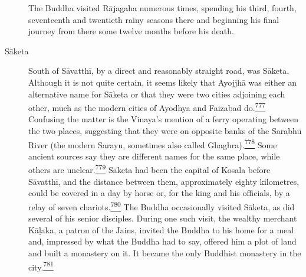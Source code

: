 \begin{description}
The Buddha visited Rājagaha numerous times, spending his third, fourth,
seventeenth and twentieth rainy seasons there and beginning his final
journey from there some twelve months before his death.
\item[Sāketa]
South of Sāvatthī, by a direct and reasonably straight road, was Sāketa.
Although it is not quite certain, it seems likely that Ayojjhā was
either an alternative name for Sāketa or that they were two cities
adjoining each other, much as the modern cities of Ayodhya and Faizabad
do.\label{footprints_split_019.html_fnref777}\hyperref[footprints_split_025.htmlux5cux23fn777]{\textsuperscript{777}}
Confusing the matter is the Vinaya's mention of a ferry operating
between the two places, suggesting that they were on opposite banks of
the Sarabhū River (the modern Sarayu, sometimes also called
Ghaghra).\label{footprints_split_019.html_fnref778}\hyperref[footprints_split_025.htmlux5cux23fn778]{\textsuperscript{778}}
Some ancient sources say they are different names for the same place,
while others are
unclear.\label{footprints_split_019.html_fnref779}\hyperref[footprints_split_025.htmlux5cux23fn779]{\textsuperscript{779}}
Sāketa had been the capital of Kosala before Sāvatthī, and the distance
between them, approximately eighty kilometres, could be covered in a day
by horse or, for the king and his officials, by a relay of seven
chariots.\label{footprints_split_019.html_fnref780}\hyperref[footprints_split_025.htmlux5cux23fn780]{\textsuperscript{780}}
The Buddha occasionally visited Sāketa, as did several of his senior
disciples. During one such visit, the wealthy merchant Kāḷaka, a patron
of the Jains, invited the Buddha to his home for a meal and, impressed
by what the Buddha had to say, offered him a plot of land and built a
monastery on it. It became the only Buddhist monastery in the
city.\label{footprints_split_019.html_fnref781}\hyperref[footprints_split_025.htmlux5cux23fn781]{\textsuperscript{781}}


\end{description}
